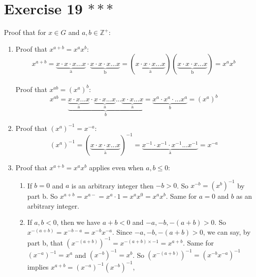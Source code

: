 \documentclass[12pt]{article}
\newcommand{\Z}{\mathbb{Z}}
\begin{document}
    \section*{Exercise 19 $***$}
    Proof that for $x \in G$ and $a, b \in \Z^{+}:$
    \begin{enumerate}[label=\textbf{\alph*.}]
        \item 
            Proof that $x^{a+b} = x^ax^b$: \\
            \[x^{a+b}
            = \underbrace{x \cdot x \cdot x ... x}_\text{a} \cdot
            \underbrace{x \cdot x \cdot x ... x}_\text{b}
            = (\underbrace{x \cdot x \cdot x ... x}_\text{a})(
                \underbrace{x \cdot x \cdot x ... x}_\text{b})
            = x^ax^b\] \\
            Proof that $x^{ab} = (x^a)^b$: \\
            \[x^{ab}
            = \underbrace{\underbrace{x \cdot x ... x}_\text{a} \cdot
            \underbrace{x \cdot x ... x}_\text{a} ...
            \underbrace{x \cdot x ... x}_\text{a}}_{b}
            = \underbrace{x^a \cdot x^a \cdot ... x^a}_{b}
            = (x^a)^b\]
        \item 
            Proof that $(x^a)^{-1} = x^{-a}$:
            \[(x^a)^{-1} = (\underbrace{x \cdot x \cdot x ... x}_\text{a})^{-1}
            = \underbrace{x^{-1} \cdot x^{-1} \cdot x^{-1} ... x^{-1}}_\text{a}
            = x^{-a}\]
        \item
            Proof that $x^{a+b} = x^ax^b$ applies even when $a, b \leqslant 0$:
            \begin{enumerate}[label=\textbf{case \arabic*:}]
                \item
                    If $b = 0$ and $a$ is an arbitrary integer
                    then $-b > 0$. So $x^{-b} = (x^{b})^{-1}$ by part b.
                    So $x^{a+b} = x^{a-} = x^a \cdot 1 = x^ax^0 = x^ax^b$.
                    Same for $a = 0$ and $b$ as an arbitrary integer.
                \item
                    If $a, b < 0$,
                    then we have $a + b < 0$
                    and $-a, -b, -(a+b) > 0$.
                    So $x^{-(a+b)} = x^{-b - a} = x^{-b}x^{-a}$.
                    Since $-a, -b, -(a+b) > 0$, we can say, by part b,
                    that $(x^{-(a+b)})^{-1} = x^{-(a+b) \times -1} = x^{a+b}$.
                    Same for $(x^{-a})^{-1} = x^a$ and $(x^{-b})^{-1} = x^b$.
                    So $(x^{-(a+b)})^{-1} = (x^{-b}x^{-a})^{-1}$
                    implies $x^{a+b} = (x^{-a})^{-1}(x^{-b})^{-1}$,

\end{enumerate}
\end{enumerate}
\end{document}
